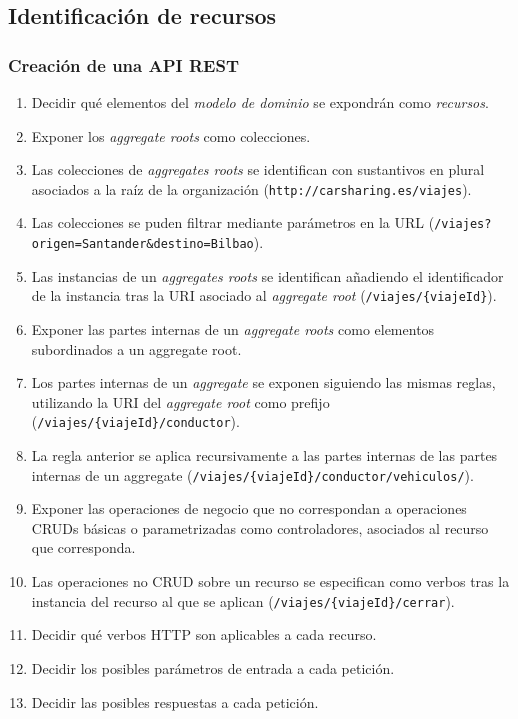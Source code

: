 \documentclass[a4paper,slidestop,blue]{beamer}
\begin{document}
\subsection{Identificación de recursos}

\begin{frame}[c, allowframebreaks]
    \frametitle{Creación de una API REST}
    \begin{enumerate}[<+->]
        \item Decidir qué elementos del \emph{modelo de dominio} se expondrán como \emph{recursos}.
        \item Exponer los \emph{aggregate roots} como colecciones.
        \item Las colecciones de \emph{aggregates roots} se identifican con sustantivos en plural asociados a la raíz de la organización (\texttt{http://carsharing.es/viajes}).
        \item Las colecciones se puden filtrar mediante parámetros en la URL (\texttt{/viajes?origen=Santander\&destino=Bilbao}).
        \item Las instancias de un \emph{aggregates roots} se identifican añadiendo el identificador de la instancia tras la URI asociado al \emph{aggregate root} (\texttt{/viajes/\{viajeId\}}).
        \item Exponer las partes internas de un \emph{aggregate roots} como elementos subordinados a un aggregate root.
        \item Los partes internas de un \emph{aggregate} se exponen siguiendo las mismas reglas, utilizando la URI del \emph{aggregate root} como prefijo (\texttt{/viajes/\{viajeId\}/conductor}).
        \item La regla anterior se aplica recursivamente a las partes internas de las partes internas de un aggregate (\texttt{/viajes/\{viajeId\}/conductor/vehiculos/}).
        \item Exponer las operaciones de negocio que no correspondan a operaciones CRUDs básicas o parametrizadas como controladores, asociados al recurso que corresponda.
        \item Las operaciones no CRUD sobre un recurso se especifican como verbos tras la instancia del recurso al que se aplican (\texttt{/viajes/\{viajeId\}/cerrar}).
        \item Decidir qué verbos HTTP son aplicables a cada recurso.
        \item Decidir los posibles parámetros de entrada a cada petición.
        \item Decidir las posibles respuestas a cada petición.
    \end{enumerate}
\end{frame}
\end{document}
